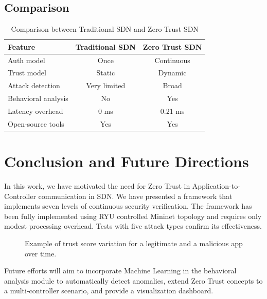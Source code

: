 \documentclass[conference]{IEEEtran}
\begin{document}
\subsection{Comparison}

\begin{table}[h]
\centering
\caption{Comparison between Traditional SDN and Zero Trust SDN}
\label{tbl:comparison}
\begin{tabular}{@{}lcc@{}}
\toprule
Feature & Traditional SDN & Zero Trust SDN \\ \midrule
Auth model & Once & Continuous \\
Trust model & Static & Dynamic \\
Attack detection & Very limited & Broad \\
Behavioral analysis & No & Yes \\
Latency overhead & 0 ms & 0.21 ms \\
Open-source tools & Yes & Yes \\
\end{tabular}
\end{table}

\section{Conclusion and Future Directions}

In this work, we have motivated the need for Zero Trust in Application-to-Controller communication in SDN. We have presented a framework that implements seven levels of continuous security verification. The framework has been fully implemented using RYU controlled Mininet topology and requires only modest processing overhead. Tests with five attack types confirm its effectiveness.

\begin{figure}[h]
\centering
\fbox{\textcolor{lightgray}{\rule{0.8\textwidth}{4cm}}}
\caption{Example of trust score variation for a legitimate and a malicious app over time.}
\label{fig:trustscore}
\end{figure}
Future efforts will aim to incorporate Machine Learning in the behavioral analysis module to automatically detect anomalies, extend Zero Trust concepts to a multi-controller scenario, and provide a visualization dashboard.
\end{document}
